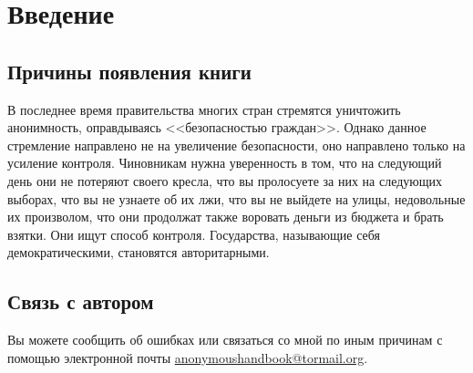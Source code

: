 \chapter*{Введение}
\section{Причины появления книги}
В последнее время правительства многих стран стремятся уничтожить анонимность, оправдываясь <<безопасностью граждан>>. Однако данное стремление направлено не на увеличение безопасности, оно направлено только на усиление контроля. Чиновникам нужна уверенность в том, что на следующий день они не потеряют своего кресла, что вы пролосуете за них на следующих выборах, что вы не узнаете об их лжи, что вы не выйдете на улицы, недовольные их произволом, что они продолжат также воровать деньги из бюджета и брать взятки. Они ищут способ контроля. Государства, называющие себя демократическими, становятся авторитарными.

\section{Связь с автором}
Вы можете сообщить об ошибках или связаться со мной по иным причинам с помощью электронной почты \href{mailto:anonymoushandbook@tormail.org}{anonymoushandbook@tormail.org}.
